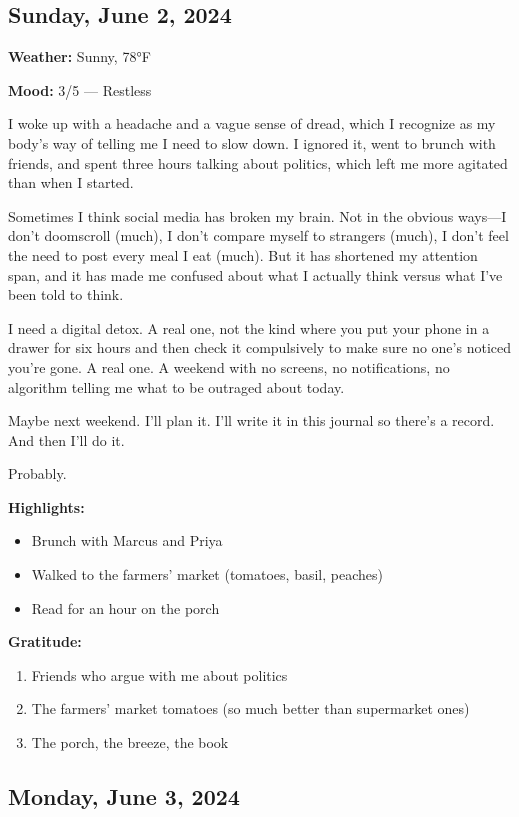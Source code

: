 \documentclass[
    language=english,
    doctype=journal,
    institution=none,
]{../../omnilatex}
\begin{document}
\subsection{Sunday, June 2, 2024}

\textbf{Weather:} Sunny, 78°F

\textbf{Mood:} 3/5 --- Restless

I woke up with a headache and a vague sense of dread, which I recognize as my body's way of telling me I need to slow down. I ignored it, went to brunch with friends, and spent three hours talking about politics, which left me more agitated than when I started.

Sometimes I think social media has broken my brain. Not in the obvious ways---I don't doomscroll (much), I don't compare myself to strangers (much), I don't feel the need to post every meal I eat (much). But it has shortened my attention span, and it has made me confused about what I actually think versus what I've been told to think.

I need a digital detox. A real one, not the kind where you put your phone in a drawer for six hours and then check it compulsively to make sure no one's noticed you're gone. A real one. A weekend with no screens, no notifications, no algorithm telling me what to be outraged about today.

Maybe next weekend. I'll plan it. I'll write it in this journal so there's a record. And then I'll do it.

Probably.

\textbf{Highlights:}
\begin{itemize}
    \item Brunch with Marcus and Priya
    \item Walked to the farmers' market (tomatoes, basil, peaches)
    \item Read for an hour on the porch
\end{itemize}

\textbf{Gratitude:}
\begin{enumerate}
    \item Friends who argue with me about politics
    \item The farmers' market tomatoes (so much better than supermarket ones)
    \item The porch, the breeze, the book
\end{enumerate}

\subsection{Monday, June 3, 2024}
\end{document}
